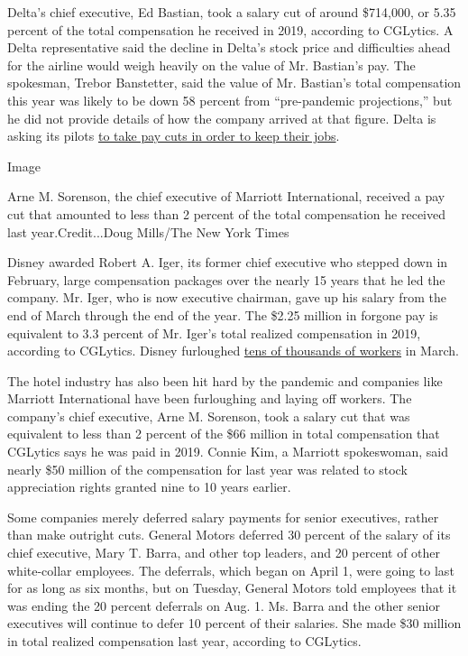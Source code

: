 Delta's chief executive, Ed Bastian, took a salary cut of around
\$714,000, or 5.35 percent of the total compensation he received in
2019, according to CGLytics. A Delta representative said the decline in
Delta's stock price and difficulties ahead for the airline would weigh
heavily on the value of Mr. Bastian's pay. The spokesman, Trebor
Banstetter, said the value of Mr. Bastian's total compensation this year
was likely to be down 58 percent from ``pre-pandemic projections,'' but
he did not provide details of how the company arrived at that figure.
Delta is asking its pilots
\href{https://www.nytimes3xbfgragh.onion/2020/07/17/business/delta-tells-its-pilots-take-a-15-percent-pay-cut-and-keep-your-jobs.html}{to
take pay cuts in order to keep their jobs}.

Image

Arne M. Sorenson, the chief executive of Marriott International,
received a pay cut that amounted to less than 2 percent of the total
compensation he received last year.Credit...Doug Mills/The New York
Times

Disney awarded Robert A. Iger, its former chief executive who stepped
down in February, large compensation packages over the nearly 15 years
that he led the company. Mr. Iger, who is now executive chairman, gave
up his salary from the end of March through the end of the year. The
\$2.25 million in forgone pay is equivalent to 3.3 percent of Mr. Iger's
total realized compensation in 2019, according to CGLytics. Disney
furloughed
\href{https://www.nytimes3xbfgragh.onion/2020/07/08/business/coronavirus-disney-world-reopening.html}{tens
of thousands of workers} in March.

The hotel industry has also been hit hard by the pandemic and companies
like Marriott International have been furloughing and laying off
workers. The company's chief executive, Arne M. Sorenson, took a salary
cut that was equivalent to less than 2 percent of the \$66 million in
total compensation that CGLytics says he was paid in 2019. Connie Kim, a
Marriott spokeswoman, said nearly \$50 million of the compensation for
last year was related to stock appreciation rights granted nine to 10
years earlier.

Some companies merely deferred salary payments for senior executives,
rather than make outright cuts. General Motors deferred 30 percent of
the salary of its chief executive, Mary T. Barra, and other top leaders,
and 20 percent of other white-collar employees. The deferrals, which
began on April 1, were going to last for as long as six months, but on
Tuesday, General Motors told employees that it was ending the 20 percent
deferrals on Aug. 1. Ms. Barra and the other senior executives will
continue to defer 10 percent of their salaries. She made \$30 million in
total realized compensation last year, according to CGLytics.

